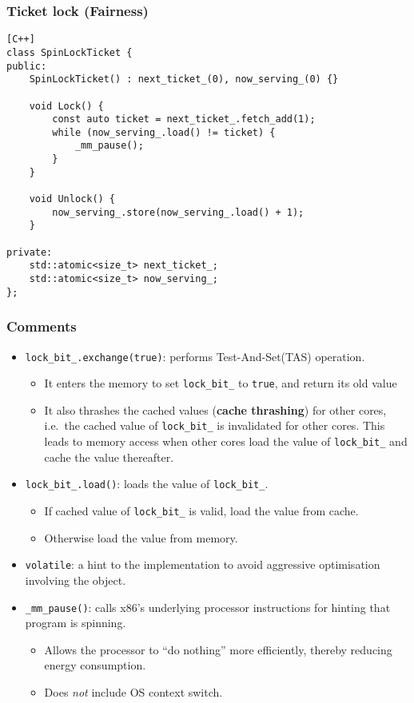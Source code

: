 \documentclass[twocolumn,landscape,10pt]{article}
\theoremstyle{definition}
\begin{document}
\subsubsection{Ticket lock (Fairness)}
\begin{lstlisting}[C++]
class SpinLockTicket {
public:
    SpinLockTicket() : next_ticket_(0), now_serving_(0) {}

    void Lock() {
        const auto ticket = next_ticket_.fetch_add(1);
        while (now_serving_.load() != ticket) {
            _mm_pause();
        }
    }

    void Unlock() {
        now_serving_.store(now_serving_.load() + 1);
    }

private:
    std::atomic<size_t> next_ticket_;
    std::atomic<size_t> now_serving_;
};
\end{lstlisting} 
\medskip
\subsubsection{Comments}
\begin{itemize}
    \item \texttt{lock\_bit\_.exchange(true)}: 
        performs Test-And-Set(TAS) operation.
        \begin{itemize}
            \item It enters the memory to set \texttt{lock\_bit\_} to
                \texttt{true}, and return its old value
            \item It also thrashes the cached values (\textbf{cache thrashing})
                for other cores, i.e.\
                the cached value of \texttt{lock\_bit\_} is invalidated for
                other cores. This leads to memory access 
                when other cores load the value of \texttt{lock\_bit\_} 
                and cache the value thereafter.
        \end{itemize} 
    \item \texttt{lock\_bit\_.load()}:
        loads the value of \texttt{lock\_bit\_}.
        \begin{itemize}
            \item If cached value of \texttt{lock\_bit\_} is valid, load the
                value from cache.
            \item Otherwise load the value from memory.
        \end{itemize} 
    \item \texttt{volatile}:
        a hint to the implementation to avoid aggressive optimisation involving
        the object.
    \item \texttt{\_mm\_pause()}:
        calls x86's underlying processor instructions for hinting that program
        is spinning.
        \begin{itemize}
            \item Allows the processor to ``do nothing'' more efficiently,
                thereby reducing energy consumption.
            \item Does \emph{not} include OS context switch.
        \end{itemize} 
\end{itemize} 
\end{document}

